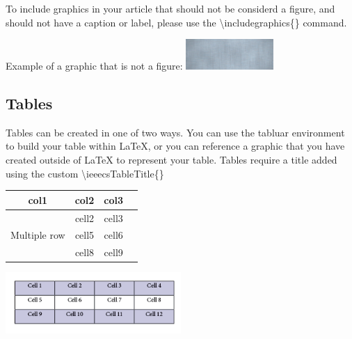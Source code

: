 \documentclass{csmagazine}
\begin{document}
To include graphics in your article that should not be considerd a figure, and should not have a caption or label, please use the \textbackslash{}includegraphics\{\} command.

Example of a graphic that is not a figure:
\includegraphics[width=0.25\textwidth]{graphic_1.png}

\subsection{Tables}

Tables can be created in one of two ways. You can use the tabluar environment to build your table within LaTeX, or you can reference a graphic that you have created outside of LaTeX to represent your table. Tables require a title added using the custom \textbackslash{}ieeecsTableTitle\{\}




\begin{table}[H]
	\begin{center}
		\begin{tabular}{ |c|c|c|c| } 
			\hline
			col1 & col2 & col3 \\
			\hline
			\multirow{3}{4em}{Multiple row} & cell2 & cell3 \\ 
			& cell5 & cell6 \\ 
			& cell8 & cell9 \\ 
			\hline
		\end{tabular}
	\end{center}
\end{table}


\begin{table}[H]
	\begin{center}
		\includegraphics[width=0.5\textwidth]{table_2.png}
	\end{center}
\end{table}
\end{document}
